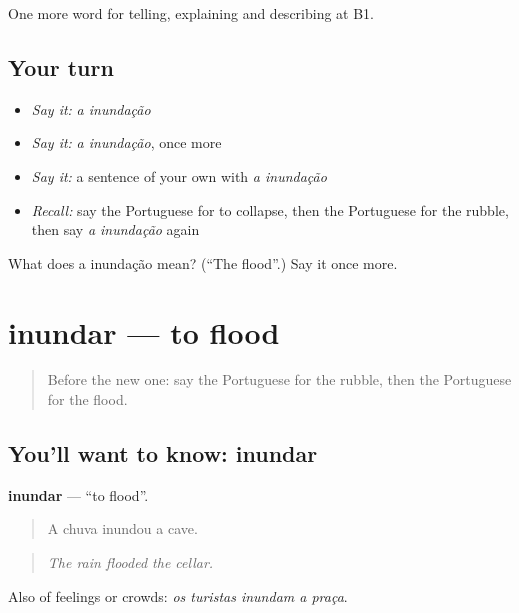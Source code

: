 \begin{grammarlens}[title={What you've built}]
One more word for telling, explaining and describing at B1.
\end{grammarlens}

\subsection*{Your turn}
\begin{itemize}
\raggedright
  \item \emph{Say it:} \emph{a inundação}
  \item \emph{Say it:} \emph{a inundação}, once more
  \item \emph{Say it:} a sentence of your own with \emph{a inundação}
  \item \emph{Recall:} say the Portuguese for to collapse, then the Portuguese for the rubble, then say \emph{a inundação} again
\end{itemize}

\begin{tcolorbox}[breakable,colback=teal!4,colframe=teal!35!black,title={Before you move on}]
What does a inundação mean? (\textquotedblleft{}The flood\textquotedblright{}.) Say it once more.
\end{tcolorbox}
\section[inundar]{inundar — to flood}

\label{lesson:PT-C303-inundar}



\begin{quote}
Before the new one: say the Portuguese for the rubble, then the Portuguese for the flood.
\end{quote}

\subsection*{You'll want to know: inundar}
\textbf{inundar} — \textquotedblleft{}to flood\textquotedblright{}.

\begin{quote}
A chuva inundou a cave.
\end{quote}

\begin{quote}
\emph{The rain flooded the cellar.}
\end{quote}

Also of feelings or crowds: \emph{os turistas inundam a praça}.

